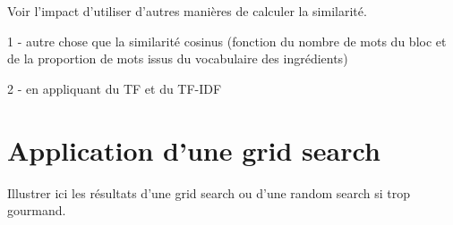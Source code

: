             Voir l'impact d'utiliser d'autres manières de calculer la similarité.

            1 - autre chose que la similarité cosinus (fonction du nombre de mots du bloc et de la proportion de mots issus du vocabulaire des ingrédients)

            2 - en appliquant du TF et du TF-IDF

        \section{Application d'une grid search}

        Illustrer ici les résultats d'une grid search ou d'une random search si trop gourmand.